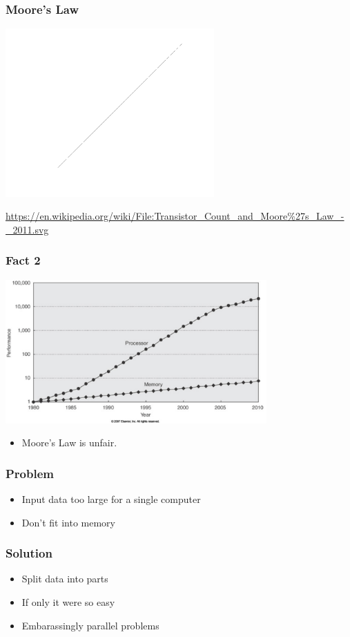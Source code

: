 \documentclass[12pt,aspectratio=169]{beamer}
\begin{document}
\begin{frame}\frametitle{Moore's Law}
  \includegraphics[width=8cm]{img/Moore_Law2}

  \tiny\url{https://en.wikipedia.org/wiki/File:Transistor_Count_and_Moore\%27s_Law_-_2011.svg}
\end{frame}





\begin{frame}\frametitle{Fact 2}
  \includegraphics[width=10cm]{img/memory-cpu-gap}
  \begin{itemize}
  \item
    Moore's Law is unfair.
  \end{itemize}
\end{frame}


\begin{frame}\frametitle{Problem}
  \begin{itemize}
  \item
    Input data too large for a single computer
  \item
    Don't fit into memory
  \end{itemize}
\end{frame}

\begin{frame}\frametitle{Solution}
  \begin{itemize}
  \item
    Split data into parts
  \item
    If only it were so easy
  \item
    Embarassingly parallel problems
  \end{itemize}
\end{frame}
\end{document}
